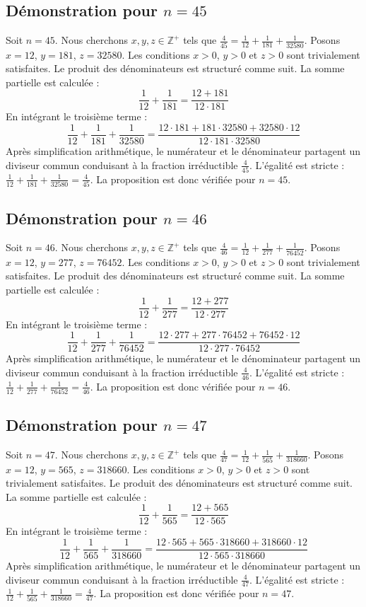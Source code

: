 \documentclass[11pt,a4paper]{article}
\begin{document}
\subsection{Démonstration pour $n = 45$}
Soit $n = 45$. Nous cherchons $x, y, z \in \mathbb{Z}^{+}$ tels que $\frac{4}{45} = \frac{1}{12} + \frac{1}{181} + \frac{1}{32580}$.
Posons $x = 12$, $y = 181$, $z = 32580$.
Les conditions $x > 0$, $y > 0$ et $z > 0$ sont trivialement satisfaites.
Le produit des dénominateurs est structuré comme suit. La somme partielle est calculée :
$$ \frac{1}{12} + \frac{1}{181} = \frac{12+181}{12 \cdot 181} $$
En intégrant le troisième terme :
$$ \frac{1}{12} + \frac{1}{181} + \frac{1}{32580} = \frac{12 \cdot 181 + 181 \cdot 32580 + 32580 \cdot 12}{12 \cdot 181 \cdot 32580} $$
Après simplification arithmétique, le numérateur et le dénominateur partagent un diviseur commun conduisant à la fraction irréductible $\frac{4}{45}$.
L'égalité est stricte : $\frac{1}{12} + \frac{1}{181} + \frac{1}{32580} = \frac{4}{45}$.
La proposition est donc vérifiée pour $n = 45$.
\subsection{Démonstration pour $n = 46$}
Soit $n = 46$. Nous cherchons $x, y, z \in \mathbb{Z}^{+}$ tels que $\frac{4}{46} = \frac{1}{12} + \frac{1}{277} + \frac{1}{76452}$.
Posons $x = 12$, $y = 277$, $z = 76452$.
Les conditions $x > 0$, $y > 0$ et $z > 0$ sont trivialement satisfaites.
Le produit des dénominateurs est structuré comme suit. La somme partielle est calculée :
$$ \frac{1}{12} + \frac{1}{277} = \frac{12+277}{12 \cdot 277} $$
En intégrant le troisième terme :
$$ \frac{1}{12} + \frac{1}{277} + \frac{1}{76452} = \frac{12 \cdot 277 + 277 \cdot 76452 + 76452 \cdot 12}{12 \cdot 277 \cdot 76452} $$
Après simplification arithmétique, le numérateur et le dénominateur partagent un diviseur commun conduisant à la fraction irréductible $\frac{4}{46}$.
L'égalité est stricte : $\frac{1}{12} + \frac{1}{277} + \frac{1}{76452} = \frac{4}{46}$.
La proposition est donc vérifiée pour $n = 46$.
\subsection{Démonstration pour $n = 47$}
Soit $n = 47$. Nous cherchons $x, y, z \in \mathbb{Z}^{+}$ tels que $\frac{4}{47} = \frac{1}{12} + \frac{1}{565} + \frac{1}{318660}$.
Posons $x = 12$, $y = 565$, $z = 318660$.
Les conditions $x > 0$, $y > 0$ et $z > 0$ sont trivialement satisfaites.
Le produit des dénominateurs est structuré comme suit. La somme partielle est calculée :
$$ \frac{1}{12} + \frac{1}{565} = \frac{12+565}{12 \cdot 565} $$
En intégrant le troisième terme :
$$ \frac{1}{12} + \frac{1}{565} + \frac{1}{318660} = \frac{12 \cdot 565 + 565 \cdot 318660 + 318660 \cdot 12}{12 \cdot 565 \cdot 318660} $$
Après simplification arithmétique, le numérateur et le dénominateur partagent un diviseur commun conduisant à la fraction irréductible $\frac{4}{47}$.
L'égalité est stricte : $\frac{1}{12} + \frac{1}{565} + \frac{1}{318660} = \frac{4}{47}$.
La proposition est donc vérifiée pour $n = 47$.
\end{document}
